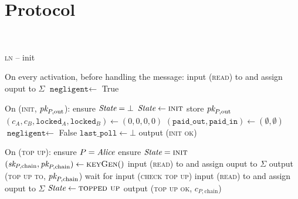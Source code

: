 \section{Protocol} \ \\
\label{sec:protocol}

\begin{center}
  \begin{processbox}{\textsc{ln} -- init}
    \begin{algorithmic}[1]
      \State {}
      \State {}
      \State On every activation, before handling the message:
      \Indent
         
          \State input (\textsc{read}) to \ledger and assign ouput to $\Sigma$
           
            \State $\texttt{negligent} \gets$ True
            \label{code:ln:init:negligent}
          \EndIf
        \EndIf
      \EndIndent
      \Statex

      \State On (\textsc{init}, $\textit{pk}_{P, \mathrm{out}}$):
      \Indent
        \State ensure $\itistate = \bot$
        \State $\itistate \gets \textsc{init}$
        \State store $\textit{pk}_{P, \mathrm{out}}$
        \State $(c_A, c_B, \texttt{locked}_A, \texttt{locked}_B) \gets (0, 0, 0,
        0)$
        \State $(\texttt{paid\_out}, \texttt{paid\_in}) \gets (\emptyset,
        \emptyset)$
        \State $\texttt{negligent} \gets$ False
        \State $\texttt{last\_poll} \gets \bot$
        \State output (\textsc{init ok})
      \EndIndent
      \Statex

      \State On (\textsc{top up}):
      \Indent
        \State ensure $P = \mathit{Alice}$ 
        \State ensure $\itistate = \textsc{init}$
        \label{code:ln:init:change-state}
        \State $(\textit{sk}_{P, \mathrm{chain}}, \textit{pk}_{P, \mathrm{chain}}) \gets
        \textsc{keyGen}()$
        \State input (\textsc{read}) to \ledger and assign ouput to $\Sigma$
        \State output (\textsc{top up to}, $\textit{pk}_{P, \mathrm{chain}}$)
          \State {}
          \State wait for input (\textsc{check top up})
          \State input (\textsc{read}) to \ledger and assign ouput to $\Sigma$
        \EndWhile
        \State $\itistate \gets \textsc{topped up}$
        \State output (\textsc{top up ok}, $c_{P, \mathrm{chain}}$)
      \EndIndent
      \Statex


\end{algorithmic}
\end{processbox}
\end{center}
